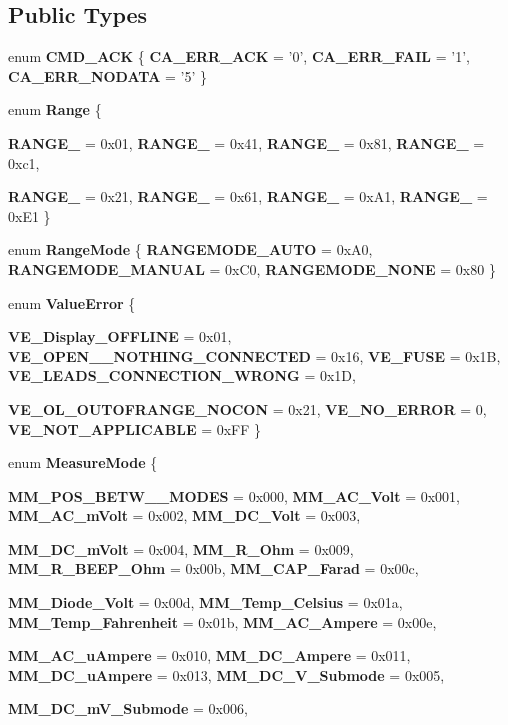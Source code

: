 \subsection*{Public Types}
\begin{DoxyCompactItemize}
\item 
enum {\bfseries CMD\_\-ACK} \{ {\bfseries CA\_\-ERR\_\-ACK} =  '0', 
{\bfseries CA\_\-ERR\_\-FAIL} =  '1', 
{\bfseries CA\_\-ERR\_\-NODATA} =  '5'
 \}
\item 
enum {\bfseries Range} \{ \par
{\bfseries RANGE\_} = 0x01, 
{\bfseries RANGE\_} = 0x41, 
{\bfseries RANGE\_} = 0x81, 
{\bfseries RANGE\_} = 0xc1, 
\par
{\bfseries RANGE\_} = 0x21, 
{\bfseries RANGE\_} = 0x61, 
{\bfseries RANGE\_} = 0xA1, 
{\bfseries RANGE\_} = 0xE1
 \}
\item 
enum {\bfseries RangeMode} \{ {\bfseries RANGEMODE\_\-AUTO} = 0xA0, 
{\bfseries RANGEMODE\_\-MANUAL} = 0xC0, 
{\bfseries RANGEMODE\_\-NONE} = 0x80
 \}
\item 
enum {\bfseries ValueError} \{ \par
{\bfseries VE\_\-Display\_\-OFFLINE} = 0x01, 
{\bfseries VE\_\-OPEN\_\-\_\-NOTHING\_\-CONNECTED} = 0x16, 
{\bfseries VE\_\-FUSE} = 0x1B, 
{\bfseries VE\_\-LEADS\_\-CONNECTION\_\-WRONG} = 0x1D, 
\par
{\bfseries VE\_\-OL\_\-OUTOFRANGE\_\-NOCON} = 0x21, 
{\bfseries VE\_\-NO\_\-ERROR} = 0, 
{\bfseries VE\_\-NOT\_\-APPLICABLE} = 0xFF
 \}
\item 
enum {\bfseries MeasureMode} \{ \par
{\bfseries MM\_\-POS\_\-BETW\_\_\-MODES} = 0x000, 
{\bfseries MM\_\-AC\_\-Volt} = 0x001, 
{\bfseries MM\_\-AC\_\-mVolt} = 0x002, 
{\bfseries MM\_\-DC\_\-Volt} = 0x003, 
\par
{\bfseries MM\_\-DC\_\-mVolt} = 0x004, 
{\bfseries MM\_\-R\_\-Ohm} = 0x009, 
{\bfseries MM\_\-R\_\-BEEP\_\-Ohm} = 0x00b, 
{\bfseries MM\_\-CAP\_\-Farad} = 0x00c, 
\par
{\bfseries MM\_\-Diode\_\-Volt} = 0x00d, 
{\bfseries MM\_\-Temp\_\-Celsius} = 0x01a, 
{\bfseries MM\_\-Temp\_\-Fahrenheit} = 0x01b, 
{\bfseries MM\_\-AC\_\-Ampere} = 0x00e, 
\par
{\bfseries MM\_\-AC\_\-uAmpere} = 0x010, 
{\bfseries MM\_\-DC\_\-Ampere} = 0x011, 
{\bfseries MM\_\-DC\_\-uAmpere} = 0x013, 
{\bfseries MM\_\-DC\_\-V\_\-Submode} = 0x005, 
\par
{\bfseries MM\_\-DC\_\-mV\_\-Submode} = 0x006, 

\end{DoxyCompactItemize}
